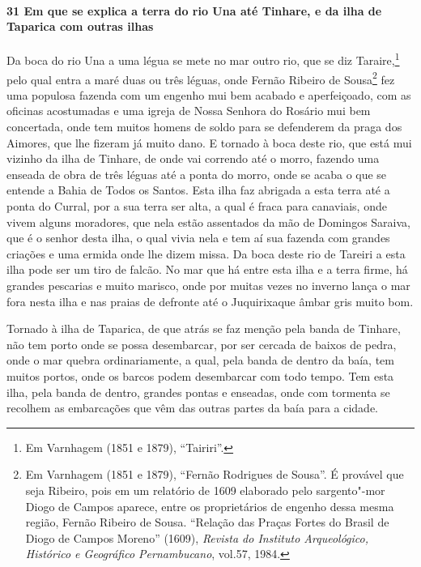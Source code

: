 \paragraph{31 Em que se explica a terra do rio Una até Tinhare, e da ilha de Taparica com
outras ilhas}

Da boca do rio Una a uma légua se mete no mar outro rio, que se diz Taraire,\footnote{ Em
Varnhagem (1851 e 1879), ``Tairiri''.} pelo qual entra a maré duas ou três léguas, onde
Fernão Ribeiro de Sousa\footnote{ Em Varnhagem (1851 e 1879), ``Fernão Rodrigues de
Sousa''. É provável que seja Ribeiro, pois em um relatório de 1609 elaborado pelo
sargento"-mor Diogo de Campos aparece, entre os proprietários de engenho dessa mesma
região, Fernão Ribeiro de Sousa. “Relação das Praças Fortes do Brasil de Diogo de Campos
Moreno” (1609), \textit{Revista do Instituto Arqueológico, Histórico e Geográfico
Pernambucano}, vol.57, 1984.} fez uma populosa fazenda com um engenho mui bem acabado e
aperfeiçoado, com as oficinas acostumadas e uma igreja de Nossa Senhora do Rosário mui bem
concertada, onde tem muitos homens de soldo para se defenderem da praga dos Aimores, que
lhe fizeram já muito dano. E tornado à boca deste rio, que
está mui vizinho da ilha de Tinhare, de onde vai correndo até o morro, fazendo uma enseada
de obra de três léguas até a ponta do morro, onde se acaba o que se entende a Bahia de
Todos os Santos. Esta ilha faz abrigada a esta terra até a ponta do Curral, por a sua
terra ser alta, a qual é fraca para canaviais, onde vivem alguns moradores, que nela estão
assentados da mão de Domingos Saraiva, que é o senhor desta ilha, o qual vivia nela e tem
aí sua fazenda com grandes criações e uma ermida onde lhe dizem missa. Da boca deste rio
de Tareiri a esta ilha pode ser um tiro de falcão. No mar que há entre esta ilha e a terra
firme, há grandes pescarias e muito marisco, onde por muitas vezes no inverno lança o mar
fora nesta ilha e nas praias de defronte até o Juquirixaque âmbar gris muito bom.

Tornado à ilha de Taparica, de que atrás se faz menção pela banda de Tinhare, não tem
porto onde se possa desembarcar, por ser cercada de baixos de pedra, onde o mar quebra
ordinariamente, a qual, pela banda de dentro da baía, tem muitos portos, onde os barcos
podem desembarcar com todo tempo. Tem esta ilha, pela banda de dentro, grandes pontas e
enseadas, onde com tormenta se recolhem as embarcações que vêm das outras partes da baía
para a cidade.

